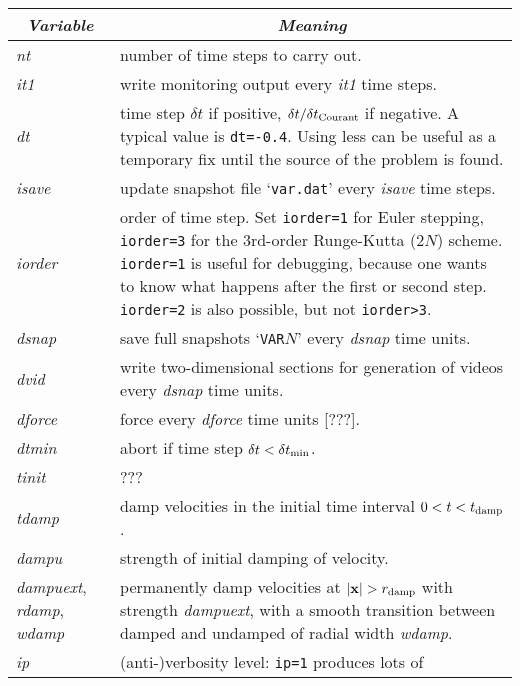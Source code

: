 \documentclass[12pt,twoside,notitlepage,a4paper]{article}
\makeatletter
\newcommand{\code}[1]{\texttt{#1}}
\newcommand{\var}[1]{\textsl{#1}\index{#1@\emph{#1}}\/}
\newcommand{\file}[1]{`\texttt{#1}'}
\newcommand{\vekt}[1] {\mathbf{#1}}
\newcommand{\xv}            {\vekt{x}}
\makeatother
\begin{document}
\begin{longtable}{lp{}}
\toprule
  \multicolumn{1}{c}{\emph{Variable}}
               & \multicolumn{1}{c}{\emph{Meaning}} \\
\midrule
  \var{nt}     & number of time steps to carry out. \\
  \var{it1}    & write monitoring output every \var{it1} time steps.\\
  \var{dt}     & time step $\delta t$ if positive,
                 $\delta t/\delta t_{\rm Courant}$ if negative. A typical
                 value is \code{dt=-0.4}. Using less can be useful as a
                 temporary fix until the source of the problem is found.\\
  \var{isave}  & update snapshot file \file{var.dat} every \var{isave}
                 time steps. \\
  \var{iorder} & order of time step. Set \code{iorder=1} for Euler
                 stepping, \code{iorder=3} for the 3rd-order Runge-Kutta
                 (2$N$) scheme. \code{iorder=1} is useful for debugging,
                 because one wants to know what happens after the first
                 or second step. \code{iorder=2} is also possible, but
                 not \code{iorder>3}.\\
  \var{dsnap}  & save full snapshots \file{VAR$N$} every \var{dsnap} time
                 units. \\
  \var{dvid}   & write two-dimensional sections for generation of videos
                 every \var{dsnap} time units. \\
  \var{dforce} & force every \var{dforce} time units [???]. \\
  \var{dtmin}  & abort if time step $\delta t < \delta t_{\rm min}$. \\
  \var{tinit}  & ??? \\
  \var{tdamp}  & damp velocities in the initial time interval
                 $0 < t < t_{\rm damp}$. \\
  \var{dampu}  & strength of initial damping of velocity. \\
  \var{dampuext}, \var{rdamp}, \var{wdamp}
               & permanently damp velocities at $|\xv| > r_{\rm damp}$
                 with strength \var{dampuext}, with a smooth transition
                 between damped and undamped of radial width \var{wdamp}. \\
  \var{ip}     & (anti-)verbosity level: \code{ip=1} produces lots of

\end{longtable}
\end{document}
